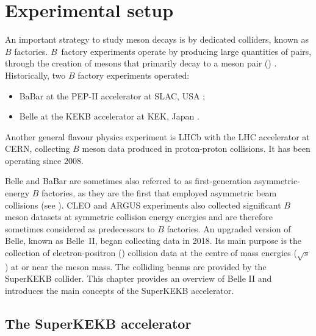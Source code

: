 \chapter{Experimental setup}\label{ch:belle2}

An important strategy to study \B meson decays is by dedicated colliders, known as $B$ factories.
$B$~factory experiments operate by producing large quantities of \BB pairs, through the creation of \FourS mesons that primarily decay to a \B meson pair (\BB) \cite{Workman:2022ynf}.
Historically, two $B$ factory experiments operated:
\begin{itemize}
    \item BaBar at the PEP-II accelerator at SLAC, USA \cite{BaBar:1995bns};
    \item Belle at the KEKB accelerator at KEK, Japan \cite{Belle:2000cnh}.
\end{itemize}
Another general flavour physics experiment is LHCb \cite{LHCb:2008vvz} with the LHC accelerator at CERN, 
collecting $B$ meson data produced in proton-proton collisions.
It has been operating since 2008.

Belle and BaBar are sometimes also referred to as first-generation asymmetric-energy $B$ factories, as they are the first that employed asymmetric beam collisions (see ).
CLEO \cite{CLEO:1982pvq} and ARGUS \cite{ARGUS:1988bds} experiments also collected significant $B$ meson datasets at symmetric \epem collision energy \FourS energies and are therefore sometimes considered as predecessors to $B$ factories. 
An upgraded version of Belle, known as Belle~II, began collecting data in 2018.
Its main purpose is the collection of electron-positron (\epem) collision data 
at the centre of mass energies ($\sqrt{s}$) at or near the \FourS meson mass.
The colliding beams are provided by the SuperKEKB collider.
This chapter provides an overview of Belle II and introduces the main concepts of the SuperKEKB accelerator.

\section{The SuperKEKB accelerator}\label{sec:superkekb}

